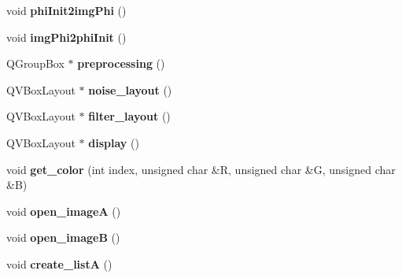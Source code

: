 \begin{DoxyCompactItemize}
\item 
\hypertarget{classofeli_1_1_image_viewer_ab5677569e65e6e6bd6d10c9630699bed}{void {\bfseries phi\-Init2img\-Phi} ()}\label{classofeli_1_1_image_viewer_ab5677569e65e6e6bd6d10c9630699bed}

\item 
\hypertarget{classofeli_1_1_image_viewer_a238d3ea2cf28650f103d8faf74c88e77}{void {\bfseries img\-Phi2phi\-Init} ()}\label{classofeli_1_1_image_viewer_a238d3ea2cf28650f103d8faf74c88e77}

\item 
\hypertarget{classofeli_1_1_image_viewer_aa1f612ad8e61bb95f6ed287e2e64e9c7}{Q\-Group\-Box $\ast$ {\bfseries preprocessing} ()}\label{classofeli_1_1_image_viewer_aa1f612ad8e61bb95f6ed287e2e64e9c7}

\item 
\hypertarget{classofeli_1_1_image_viewer_affd9a715f2a379f6291638b1e6fa62fb}{Q\-V\-Box\-Layout $\ast$ {\bfseries noise\-\_\-layout} ()}\label{classofeli_1_1_image_viewer_affd9a715f2a379f6291638b1e6fa62fb}

\item 
\hypertarget{classofeli_1_1_image_viewer_a7e725a2fa0c27866f220d9f83165de48}{Q\-V\-Box\-Layout $\ast$ {\bfseries filter\-\_\-layout} ()}\label{classofeli_1_1_image_viewer_a7e725a2fa0c27866f220d9f83165de48}

\item 
\hypertarget{classofeli_1_1_image_viewer_ae4b3836e6187703e165ae2d51db2a1e0}{Q\-V\-Box\-Layout $\ast$ {\bfseries display} ()}\label{classofeli_1_1_image_viewer_ae4b3836e6187703e165ae2d51db2a1e0}

\item 
\hypertarget{classofeli_1_1_image_viewer_adf28c2399e2ff215873b62eac58d5523}{void {\bfseries get\-\_\-color} (int index, unsigned char \&R, unsigned char \&G, unsigned char \&B)}\label{classofeli_1_1_image_viewer_adf28c2399e2ff215873b62eac58d5523}

\item 
\hypertarget{classofeli_1_1_image_viewer_a5406bbde688e6984575cb36842e9c0ac}{void {\bfseries open\-\_\-image\-A} ()}\label{classofeli_1_1_image_viewer_a5406bbde688e6984575cb36842e9c0ac}

\item 
\hypertarget{classofeli_1_1_image_viewer_a7ffd8753c0c58a1942543847891e098c}{void {\bfseries open\-\_\-image\-B} ()}\label{classofeli_1_1_image_viewer_a7ffd8753c0c58a1942543847891e098c}

\item 
\hypertarget{classofeli_1_1_image_viewer_aef95e86d4fd981ecb31fae2cec17a589}{void {\bfseries create\-\_\-list\-A} ()}\label{classofeli_1_1_image_viewer_aef95e86d4fd981ecb31fae2cec17a589}


\end{DoxyCompactItemize}
